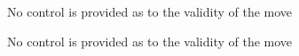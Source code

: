 
\begin{DoxyRefList}
\item[\label{bug__bug000001}%
\hypertarget{bug__bug000001}{}%
Member \hyperlink{jeu_8h_a38d8b6abecddf010d19255f48631a245}{Make\+A\+Move} (C\+Mat \&Grid, const C\+Position \&Pos, const char \&Direction, const \hyperlink{struct_c_my_param}{C\+My\+Param} \&Params)]No control is provided as to the validity of the move 

No control is provided as to the validity of the move 
\end{DoxyRefList}